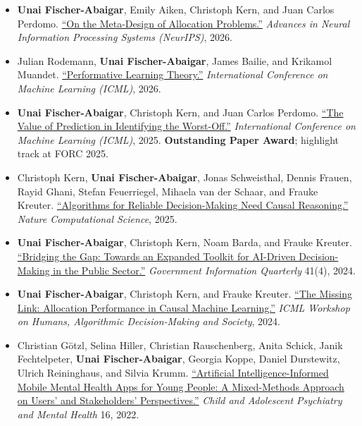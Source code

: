 \documentclass[10pt,letterpaper]{article}
\newcommand{\me}{\textbf{Unai Fischer-Abaigar}}
\begin{document}
\begin{itemize}
  \item \me, Emily Aiken, Christoph Kern, and Juan Carlos Perdomo.
  \href{https://arxiv.org/abs/2602.08786}{``On the Meta-Design of Allocation Problems.''}
  \textit{Advances in Neural Information Processing Systems (NeurIPS)}, 2026.

  \item Julian Rodemann, \me, James Bailie, and Krikamol Muandet.
  \href{https://arxiv.org/abs/2602.04402}{``Performative Learning Theory.''}
  \textit{International Conference on Machine Learning (ICML)}, 2026.

\end{itemize}
\newpage
\begin{itemize}

  \item \me, Christoph Kern, and Juan Carlos Perdomo.
  \href{https://arxiv.org/abs/2501.19334}{``The Value of Prediction in Identifying the Worst-Off.''}
  \textit{International Conference on Machine Learning (ICML)}, 2025.
  \textbf{Outstanding Paper Award}; highlight track at FORC 2025.

  \item Christoph Kern, \me, Jonas Schweisthal, Dennis Frauen, Rayid Ghani, Stefan Feuerriegel, Mihaela van der Schaar, and Frauke Kreuter.
  \href{https://doi.org/10.1038/s43588-025-00814-9}{``Algorithms for Reliable Decision-Making Need Causal Reasoning.''}
  \textit{Nature Computational Science}, 2025.

  \item \me, Christoph Kern, Noam Barda, and Frauke Kreuter.
  \href{https://doi.org/10.1016/j.giq.2024.101976}{``Bridging the Gap: Towards an Expanded Toolkit for AI-Driven Decision-Making in the Public Sector.''}
  \textit{Government Information Quarterly} 41(4), 2024.

  \item \me, Christoph Kern, and Frauke Kreuter.
  \href{https://arxiv.org/abs/2407.10779}{``The Missing Link: Allocation Performance in Causal Machine Learning.''}
  \textit{ICML Workshop on Humans, Algorithmic Decision-Making and Society}, 2024.

  \item Christian G\"otzl, Selina Hiller, Christian Rauschenberg, Anita Schick, Janik Fechtelpeter, \me, Georgia Koppe, Daniel Durstewitz, Ulrich Reininghaus, and Silvia Krumm.
  \href{https://doi.org/10.1186/s13034-022-00522-6}{``Artificial Intelligence-Informed Mobile Mental Health Apps for Young People: A Mixed-Methods Approach on Users' and Stakeholders' Perspectives.''}
  \textit{Child and Adolescent Psychiatry and Mental Health} 16, 2022.
\end{itemize}
\end{document}
